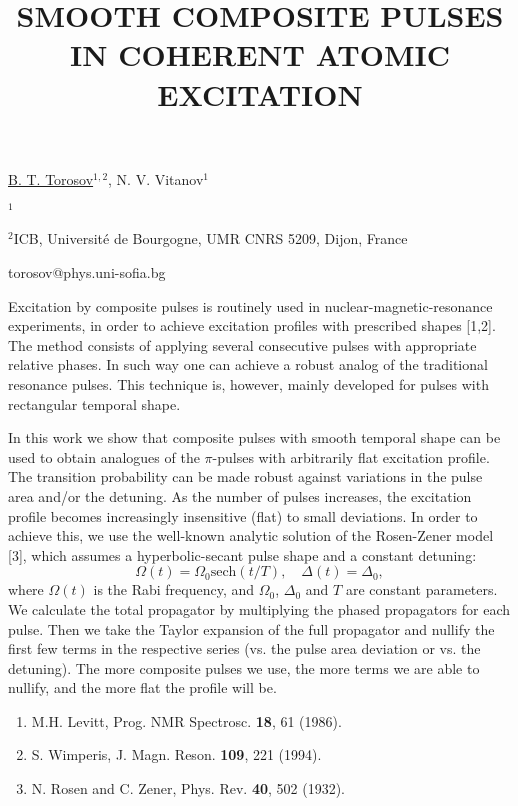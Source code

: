 \title{SMOOTH COMPOSITE PULSES IN COHERENT ATOMIC EXCITATION}

\underline{B. T. Torosov}$^{1,2}$, N. V. Vitanov$^{1}$  

{\normalsize{

\vspace{-4mm} $^1$\unisofia

\vspace{-4mm} $^2$ICB, Universit\'{e} de Bourgogne, UMR CNRS 5209, Dijon, France

\email torosov@phys.uni-sofia.bg}}

Excitation by composite pulses is routinely used in nuclear-magnetic-resonance experiments, in order to achieve excitation profiles with prescribed shapes [1,2]. The method consists of applying several consecutive pulses with appropriate relative phases. In such way one can achieve a robust analog of the traditional resonance pulses. This technique is, however, mainly developed for pulses with rectangular temporal shape.

In this work we show that composite pulses with smooth temporal shape can be used to obtain analogues of the $\pi$-pulses with arbitrarily flat excitation profile. The transition probability can be made robust against variations in the pulse area and/or the detuning. As the number of pulses increases, the excitation profile becomes increasingly insensitive (flat) to small deviations. In order to achieve this, we use the well-known analytic solution of the Rosen-Zener model [3], which assumes a hyperbolic-secant pulse shape and a constant detuning:
\begin{equation}
\Omega(t)=\Omega_0 \textrm{sech} (t/T),\quad \Delta(t)=\Delta_0,
\end{equation}
where $\Omega(t)$ is the Rabi frequency, and $\Omega_0$, $\Delta_0$ and $T$ are constant parameters. We calculate the total propagator by multiplying the phased propagators for each pulse. Then we take the Taylor expansion of the full propagator and nullify the first few terms in the respective series (vs. the pulse area deviation or vs. the detuning). The more composite pulses we use, the more terms we are able to nullify, and the more flat the profile will be.

\begin{enumerate}
\item M.H. Levitt, Prog. NMR Spectrosc. \textbf{18}, 61 (1986).
\item S. Wimperis, J. Magn. Reson. \textbf{109}, 221 (1994).
\item N. Rosen and C. Zener, Phys. Rev. \textbf{40}, 502 (1932).
\end{enumerate}

\vspace{\baselineskip}
